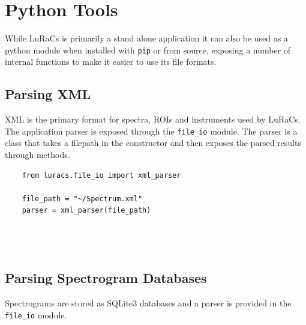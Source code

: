 \section{Python Tools}
While LuRaCs is primarily a stand alone application it can also be used as a python module when installed with \texttt{pip} or from source, exposing a number of internal functions to make it easier to use its file formats.

\subsection{Parsing XML}
XML is the primary format for spectra, ROIs and instruments used by LuRaCs. The application parser is exposed through the \texttt{file\_io} module. The parser is a class that takes a filepath in the constructor and then exposes the parsed results through methods.

\begin{verbatim}
    from luracs.file_io import xml_parser

    file_path = "~/Spectrum.xml"
    parser = xml_parser(file_path)

    


\end{verbatim}

\subsection{Parsing Spectrogram Databases}
Spectrograms are stored as SQLite3 databases and a parser is provided in the \texttt{file\_io} module.